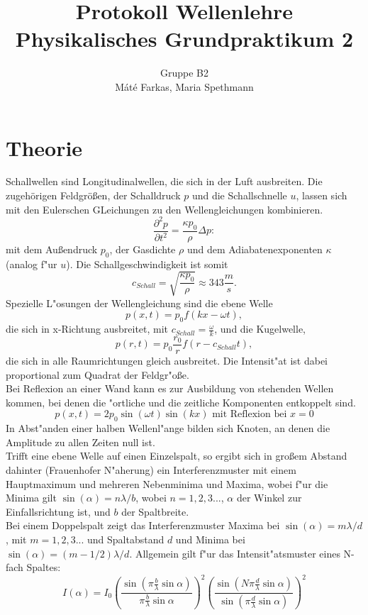 \documentclass[12pt,a4paper]{article}
\author{Gruppe B2 \\ Máté Farkas, Maria Spethmann}
\title{Protokoll Wellenlehre \\ Physikalisches Grundpraktikum 2}
\begin{document}
	\maketitle\thispagestyle{empty} %
	\newpage
	\pagestyle{headings} %
	\tableofcontents
	\newpage

\section{Theorie}

Schallwellen sind Longitudinalwellen, die sich in der Luft ausbreiten. Die zugehörigen Feldgrößen, der Schalldruck $p$ und die Schallschnelle $u$, lassen sich mit den Eulerschen GLeichungen zu den Wellengleichungen kombinieren.
\begin{equation}
\frac{\partial^2p}{\partial t^2}=\frac{\kappa p_0}{\rho}\Delta p:
\end{equation}
mit dem Außendruck $p_0$, der Gasdichte $\rho$ und dem Adiabatenexponenten $\kappa$ (analog f"ur $u$).
Die Schallgeschwindigkeit ist somit
\begin{equation}
c_{Schall}=\sqrt{\frac{\kappa p_0}{\rho}}\approx343\frac{m}{s}.
\end{equation}
Spezielle L"osungen der Wellengleichung sind die ebene Welle
\begin{equation}
p(x,t)=p_0f(kx-\omega t),
\end{equation}
die sich in x-Richtung ausbreitet, mit $c_{Schall}=\frac{\omega}{k}$, und die Kugelwelle,
\begin{equation}
p(r,t)=p_0\frac{r_0}{r}f(r-c_{Schall}t),
\end{equation}
die sich in alle Raumrichtungen gleich ausbreitet. Die Intensit"at ist dabei proportional zum Quadrat der Feldgr"o\ss e.\\
Bei Reflexion an einer Wand kann es zur Ausbildung von stehenden Wellen kommen, bei denen die "ortliche und die zeitliche Komponenten entkoppelt sind. 
\begin{equation}
p(x,t)=2p_0\sin(\omega t)\sin(kx)\text{\ \ \ \ mit Reflexion bei }x=0
\end{equation}
In Abst"anden einer halben Wellenl"ange bilden sich Knoten, an denen die Amplitude zu allen Zeiten null ist.\\
Trifft eine ebene Welle auf einen Einzelspalt, so ergibt sich in gro\ss em Abstand dahinter (Frauenhofer N"aherung) ein Interferenzmuster mit einem Hauptmaximum und mehreren Nebenminima und Maxima, wobei f"ur die Minima gilt $\sin(\alpha)=n\lambda/b$, wobei $n=1,2,3...$, $\alpha$ der Winkel zur Einfallsrichtung ist, und $b$ der Spaltbreite.\\
Bei einem Doppelspalt zeigt das Interferenzmuster Maxima bei $\sin(\alpha)=m\lambda/d$, mit $m=1,2,3...$ und Spaltabstand $d$ und Minima bei $\sin(\alpha)=(m-1/2)\lambda/d$.
Allgemein gilt f"ur das Intensit"atsmuster eines N-fach Spaltes:
\begin{equation}
I(\alpha)=I_0\left(\frac{\sin(\pi\frac{b}{\lambda}\sin\alpha)}{\pi\frac{b}{\lambda}\sin\alpha}\right)^2\left(\frac{\sin(N\pi\frac{d}{\lambda}\sin\alpha)}{\sin(\pi\frac{d}{\lambda}\sin\alpha)}\right)^2
\end{equation}
\end{document}
